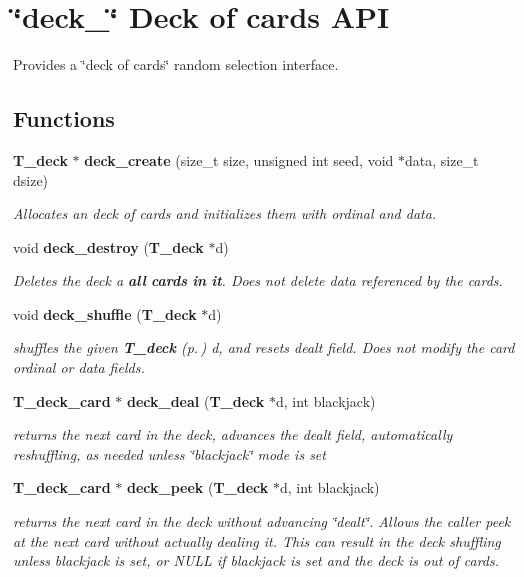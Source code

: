 \section{\char`\"{}deck\_\-\char`\"{} Deck of cards API}
\label{group__deck}
Provides a \char`\"{}deck of cards\char`\"{} random selection interface. 
\subsection*{Functions}
\begin{CompactItemize}
\item 
{\bf T\_\-deck} $\ast$ {\bf deck\_\-create} (size\_\-t size, unsigned int seed, void $\ast$data, size\_\-t dsize)
\begin{CompactList}\small\item\em Allocates an deck of cards and initializes them with ordinal and data.\item\end{CompactList}\item 
void {\bf deck\_\-destroy} ({\bf T\_\-deck} $\ast$d)
\begin{CompactList}\small\item\em Deletes the deck a {\bf all} {\bf cards} {\bf in} {\bf it}. Does not delete data referenced by the cards.\item\end{CompactList}\item 
void {\bf deck\_\-shuffle} ({\bf T\_\-deck} $\ast$d)
\begin{CompactList}\small\item\em shuffles the given {\bf T\_\-deck} {\rm (p.\,\pageref{structT__deck})} d, and resets dealt field. Does not modify the card ordinal or data fields.\item\end{CompactList}\item 
{\bf T\_\-deck\_\-card} $\ast$ {\bf deck\_\-deal} ({\bf T\_\-deck} $\ast$d, int blackjack)
\begin{CompactList}\small\item\em returns the next card in the deck, advances the dealt field, automatically reshuffling, as needed unless \char`\"{}blackjack\char`\"{} mode is set\item\end{CompactList}\item 
{\bf T\_\-deck\_\-card} $\ast$ {\bf deck\_\-peek} ({\bf T\_\-deck} $\ast$d, int blackjack)
\begin{CompactList}\small\item\em returns the next card in the deck without advancing \char`\"{}dealt\char`\"{}. Allows the caller peek at the next card without actually dealing it. This can result in the deck shuffling unless blackjack is set, or NULL if blackjack is set and the deck is out of cards.\item\end{CompactList}\end{CompactItemize}


